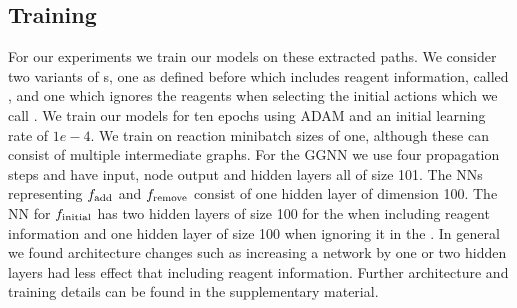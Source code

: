 \subsection{Training}

For our experiments we train our \ourModel models on these extracted paths.
We consider two variants of {\ourModel}s, one as defined before which includes reagent information, called \ourModelR, and one which ignores the reagents when selecting the initial actions which we call \ourModelIR.
We train our models for ten epochs using ADAM \citep{kingma2014adam} and an initial learning rate of $1e-4$.
We train on reaction minibatch sizes of one, although these can consist of multiple intermediate graphs.
For the GGNN we use four propagation steps and have input, node output and hidden layers all of size 101. 
The NNs representing $f_{\textrm{add}}$ and  $f_{\textrm{remove}}$ consist of one hidden layer of dimension 100. 
The NN for $f_{\textrm{initial}}$ has two hidden layers of size 100 for the \ourModelR when including reagent information and one hidden layer of size 100 when ignoring it in the \ourModelIR. In general we found architecture changes such as increasing a network by one or two hidden layers had less effect that including reagent information.
Further architecture and training details can be found in the supplementary material.